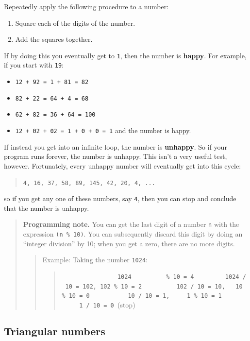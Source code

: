 \documentclass[12pt,a4paper,times]{article}
\begin{document}
Repeatedly apply the following procedure to a number:
\begin{enumerate}
\item Square each of the digits of the number.
\item Add the squares together.
\end{enumerate}
If by doing this you eventually get to \verb!1!, then the number is \textbf{happy}.
For example, if you start with \verb!19!:
\begin{itemize}
\item
  \texttt{12\ +\ 92\ =\ 1\ +\ 81\ =\ 82}
\item
  \texttt{82\ +\ 22\ =\ 64\ +\ 4\ =\ 68}
\item
  \texttt{62\ +\ 82\ =\ 36\ +\ 64\ =\ 100}
\item
  \texttt{12\ +\ 02\ +\ 02\ =\ 1\ +\ 0\ +\ 0\ =\ 1} and the number is happy.
\end{itemize}
If instead you get into an infinite loop, the number is
\textbf{unhappy}. So if your program runs forever, the number is
unhappy. This isn't a very useful test, however. Fortunately, every
unhappy number will eventually get into this cycle:
\begin{quote}
\texttt{4,\ 16,\ 37,\ 58,\ 89,\ 145,\ 42,\ 20,\ 4,\ ...}
\end{quote}
so if you get any one of these numbers, say \verb!4!, then you can
stop and conclude that the number is unhappy.
\begin{quote}
\textbf{Programming note.} You can get the last digit of a
number \verb!n! with the expression \texttt{(n\ \%\ 10)}. You can
subsequently discard this digit by doing an ``integer division'' by 10;
when you get a zero, there are no more digits.
\begin{quote}
Example: Taking the number \verb!1024!:
\begin{quote}
\texttt{~~~~~~~~~~~~~~~~1024\ \ \ \ \ \ \ \ \ \ \%\ 10\ =\ 4\ \ \ \ \ \ \ \ \ 1024\ /\ 10\ =\ 102,\ 102\ \%\ 10\ =\ 2\ \ \ \ \ \ \ \ \ ~102\ /\ 10\ =\ 10,~~\ 10\ \%\ 10\ =\ 0\ \ \ \ \ \ \ \ \ ~~10\ /\ 10\ =\ 1,~~~~\ 1\ \%\ 10\ =\ 1\ \ \ \ \ \ \ \ \ ~~\ 1\ /\ 10\ =\ 0\ }(stop)
\end{quote}
\end{quote}
\end{quote}

\subsection{Triangular numbers}\label{triangular-numbers}
\end{document}
